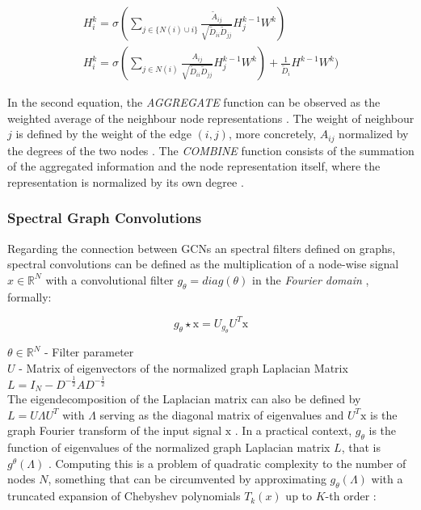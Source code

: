 \documentclass[11pt,a4paper]{article}
\begin{document}
\begin{gather}
    H^k_i = \sigma(\sum_{j \in \{N(i) \cup i\}} \frac{\tilde{A}_{ij}}{\sqrt{\tilde{D}_{ii} \tilde{D}_{jj}}} H^{k-1}_j W^k) \\
    H^k_i = \sigma(\sum_{j \in N(i)} \frac{A_{ij}}{\sqrt{\tilde{D}_{ii} \tilde{D}_{jj}}} H^{k-1}_j W^k) + \frac{1}{\tilde{D}_i} H^{k-1} W^k)
\end{gather}

In the second equation, the \textit{AGGREGATE} function can be observed as the weighted average of the neighbour node representations \cite{tangGraphNeuralNetworks2022}. The weight of neighbour $j$ is defined by the weight of the edge $(i,j)$, more concretely, $A_{ij}$ normalized by the degrees of the two nodes \cite{tangGraphNeuralNetworks2022}. The \textit{COMBINE} function consists of the summation of the aggregated information and the node representation itself, where the representation is normalized by its own degree \cite{tangGraphNeuralNetworks2022}.

\subsubsection*{Spectral Graph Convolutions}

Regarding the connection between GCNs an spectral filters defined on graphs, spectral convolutions can be defined as the multiplication of a node-wise signal $x \in \mathbb{R}^N$ with a convolutional filter $g_\theta = diag(\theta)$ in the \textit{Fourier domain} \cite{liuIntroductionGraphNeural2020, tangGraphNeuralNetworks2022}, formally:

\begin{equation}    
g_\theta \star \text{x} = U_{g_\theta} U^T \text{x}
\end{equation}

$\theta \in \mathbb{R}^N$ - Filter parameter \\
$U$ - Matrix of eigenvectors of the normalized graph Laplacian Matrix $L = I_N - D^{-\frac{1}{2}} AD^{-\frac{1}{2}}$ \\

 The eigendecomposition of the Laplacian matrix can also be defined by $L = U \Lambda U^T$ with $\Lambda$ serving as the diagonal matrix of eigenvalues and $U^T \text{x}$ is the graph Fourier transform of the input signal $\text{x}$ \cite{tangGraphNeuralNetworks2022}. In a practical context, $g_\theta$ is the function of eigenvalues of the normalized graph Laplacian matrix $L$, that is $g^\theta(\Lambda)$ \cite{liuIntroductionGraphNeural2020, tangGraphNeuralNetworks2022}. Computing this is a problem of quadratic complexity to the number of nodes $N$, something that can be circumvented by approximating $g_\theta (\Lambda)$ with a truncated expansion of Chebyshev polynomials $T_k(x)$ up to $K$-th order \cite{liuIntroductionGraphNeural2020, tangGraphNeuralNetworks2022}:
\end{document}
